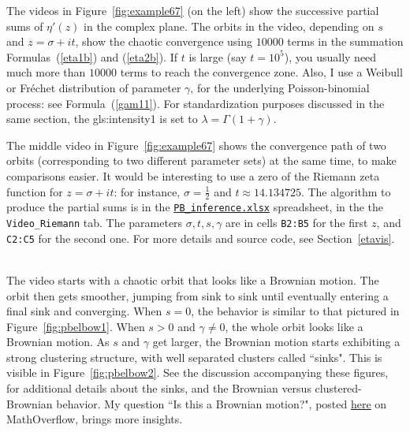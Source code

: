 \documentclass[10pt]{article}
\begin{document}
The videos in Figure~\ref{fig:example67} (on the left) show the successive partial sums of $\eta'(z)$ in the complex plane. The orbits in the video, depending on $s$ and $z=\sigma + it$, show the chaotic convergence using $\num{10000}$ terms in the summation Formulas~(\ref{eta1b}) and (\ref{eta2b}). If $t$ is large (say $t=10^5$), you usually need much more than $\num{10000}$ terms to reach the convergence zone. Also, I use a \textcolor{index}{Weibull}
or \textcolor{index}{Fréchet}
distribution of parameter $\gamma$, for the underlying Poisson-binomial process: see
 Formula~(\ref{gam11}).  For standardization purposes discussed in the same section, the \gls{gls:intensity1} is set to $\lambda=\Gamma(1+\gamma)$.

The middle video in Figure~\ref{fig:example67} shows the convergence path of  two orbits (corresponding to two different parameter sets) at the same time, to make comparisons easier. It would be interesting to use a zero of the Riemann zeta function for $z=\sigma+it$: for instance,
$\sigma=\frac{1}{2}$ and $t\approx 14.134725$. The algorithm to produce the partial sums is in the
\href{https://github.com/VincentGranville/Point-Processes/tree/main/Spreadsheets}{\texttt{PB\_inference.xlsx}} spreadsheet, in the the \texttt{Video\_Riemann} tab. The parameters $\sigma,t,s,\gamma$ are in cells
\texttt{B2:B5} for the
first $z$, and \texttt{C2:C5} for the second one. For more details and source code, see Section~\ref{etavis}.\\
 \quad \\

\noindent The video starts with a chaotic orbit that looks like a \textcolor{index}{Brownian motion}. The orbit then gets smoother, jumping from sink to sink until eventually entering a final sink and converging. When $s=0$, the behavior is similar to that pictured in Figure~\ref{fig:pbelbow1}. When $s>0$ and $\gamma\neq 0$,
the whole orbit looks like a Brownian motion. As $s$ and $\gamma$ get larger, the Brownian motion starts exhibiting a strong clustering structure, with well separated clusters called ``sinks".  This is visible in Figure~\ref{fig:pbelbow2}. See the discussion accompanying these figures, for additional details about the sinks, and the Brownian versus clustered-Brownian behavior. My question ``Is this a Brownian motion?", posted
\href{https://mathoverflow.net/questions/414938/is-this-a-brownian-motion}{here} on MathOverflow, brings more insights.
\end{document}
